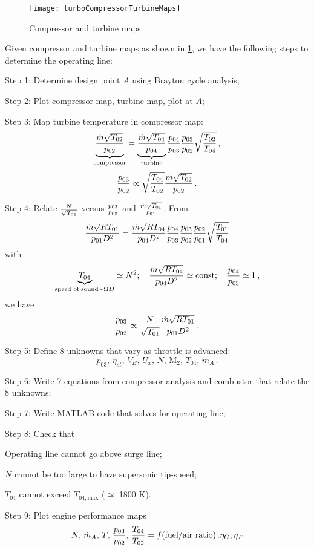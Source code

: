 \begin{figure}[!htb!]
 \centering
    {\texttt{[image: turboCompressorTurbineMaps]}}
    \caption{\label{fig:compressorTurbineMaps}Compressor and turbine maps.}
\end{figure}

Given compressor and turbine maps as shown in \cref{fig:compressorTurbineMaps}, we have the following steps to determine the operating line:
\begin{itemizePacked}
\item Step 1: Determine design point $A$ using Brayton cycle analysis;
\item Step 2: Plot compressor map, turbine map, plot at $A$;
\item Step 3: Map turbine temperature in compressor map:
  \[
    \underbrace{{\frac{\dot{m}\sqrt{T_{02}}}{p_{02}}}}_\text{compressor} = \underbrace{{\frac{\dot{m}\sqrt{T_{04}}}{p_{04}}}}_\text{turbine} {\frac{p_{04}}{p_{03}}} {\frac{p_{03}}{p_{02}}} \sqrt{{\frac{T_{02}}{T_{04}}}}\,,
  \]
  \[
    {\frac{p_{03}}{p_{02}}} \propto \sqrt{{\frac{T_{04}}{T_{02}}}} {\frac{\dot{m}\sqrt{T_{02}}}{p_{02}}}\,. 
  \]
\item Step 4: Relate ${\frac{N}{\sqrt{T_{01}}}}$ versus ${\frac{p_{03}}{p_{02}}}$ and $ {\frac{\dot{m}\sqrt{T_{01}}}{p_{01}}}$. From 
  \[
    {\frac{\dot{m}\sqrt{R T_{01}}}{p_{01} D^2}} = {\frac{\dot{m}\sqrt{R T_{04}}}{p_{04} D^2}} {\frac{p_{04}}{p_{03}}} {\frac{p_{03}}{p_{02}}} {\frac{p_{02}}{p_{01}}} \sqrt{{\frac{T_{01}}{T_{04}}}}
  \]
  with 
  \[
    \underbrace{T_{04}}_{\text{speed of sound} \sim \Omega D} \simeq N^2 ; \quad  {\frac{\dot{m}\sqrt{R T_{04}}}{p_{04} D^2}} \simeq \text{const} ; \quad {\frac{p_{04}}{p_{03}}} \simeq 1 \,,
  \]
  we have
  \[
    {\frac{p_{03}}{p_{02}}} \propto {\frac{N}{\sqrt{T_{01}}}}  {\frac{\dot{m}\sqrt{R T_{01}}}{p_{01} D^2}}\,.
  \]
\item Step 5: Define 8 unknowns that vary as throttle is advanced:
  \[
     p_{03},\, \eta_{st},\, V_B,\, U_x,\, N,\, \text{M}_2,\, T_{04},\, \dot{m}_A\,.
  \]
\item Step 6: Write 7 equations from compressor analysis and combustor that relate the 8 unknowns;
\item Step 7: Write MATLAB code that solves for operating line;
\item Step 8: Check that
  \begin{itemizePacked}
  \item Operating line cannot go above surge line;
  \item $N$ cannot be too large to have supersonic tip-speed;
  \item $T_{04}$ cannot exceed $T_{04, \text{max}}$ ($\simeq$ 1800 K).
  \end{itemizePacked}
\item Step 9: Plot engine performance maps
  \[
    N,\, \dot{m}_A,\, T,\, {\frac{p_{03}}{p_{02}}},\, {\frac{T_{04}}{T_{02}}} = f(\text{fuel/air ratio})\,. \eta_C, \eta_T
  \]
\end{itemizePacked}
























